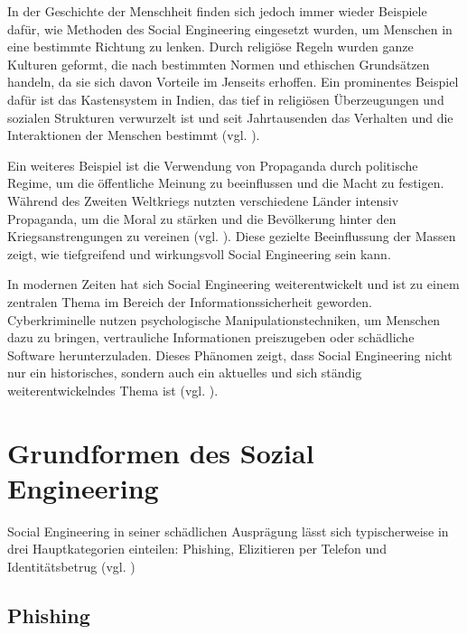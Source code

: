In der Geschichte der Menschheit finden sich jedoch immer wieder Beispiele dafür, wie Methoden des Social Engineering eingesetzt wurden, um Menschen in eine bestimmte Richtung zu lenken. Durch religiöse Regeln wurden ganze Kulturen geformt, die nach bestimmten Normen und ethischen Grundsätzen handeln, da sie sich davon Vorteile im Jenseits erhoffen. Ein prominentes Beispiel dafür ist das Kastensystem in Indien, das tief in religiösen Überzeugungen und sozialen Strukturen verwurzelt ist und seit Jahrtausenden das Verhalten und die Interaktionen der Menschen bestimmt (vgl. \cite{hindu}).

Ein weiteres Beispiel ist die Verwendung von Propaganda durch politische Regime, um die öffentliche Meinung zu beeinflussen und die Macht zu festigen. Während des Zweiten Weltkriegs nutzten verschiedene Länder intensiv Propaganda, um die Moral zu stärken und die Bevölkerung hinter den Kriegsanstrengungen zu vereinen (vgl. \cite{hisofpropaganda}). Diese gezielte Beeinflussung der Massen zeigt, wie tiefgreifend und wirkungsvoll Social Engineering sein kann.

In modernen Zeiten hat sich Social Engineering weiterentwickelt und ist zu einem zentralen Thema im Bereich der Informationssicherheit geworden. Cyberkriminelle nutzen psychologische Manipulationstechniken, um Menschen dazu zu bringen, vertrauliche Informationen preiszugeben oder schädliche Software herunterzuladen. Dieses Phänomen zeigt, dass Social Engineering nicht nur ein historisches, sondern auch ein aktuelles und sich ständig weiterentwickelndes Thema ist (vgl. \cite{mitn1}).

\section{Grundformen des Sozial Engineering}

Social Engineering in seiner schädlichen Ausprägung lässt sich typischerweise in drei Hauptkategorien einteilen: Phishing, Elizitieren per Telefon und Identitätsbetrug (vgl. \cite{GrundformenDesSE})

\subsection{Phishing}

